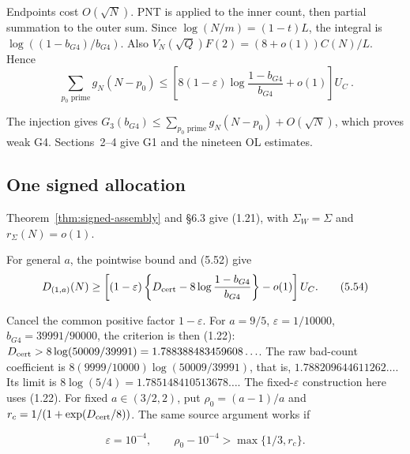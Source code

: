 Endpoints cost $O(\sqrt N)$.
PNT is applied to the inner count, then partial summation to the outer sum.
Since $\log(N/m)=(1-t)L$, the integral is
$\log((1-b_{G4})/b_{G4})$.
Also $V_N(\sqrt Q)F(2)=(8+o(1))C(N)/L$.
Hence
\[
 \boxed{\ \sum_{p_0\text{ prime}}g_N(N-p_0)\le
 \left[8(1-\varepsilon)\log\frac{1-b_{G4}}{b_{G4}}+o(1)\right]U_C\ }.
\tag{5.52}
\]

The injection gives
$G_3(b_{G4})\le\sum_{p_0\text{ prime}}g_N(N-p_0)+O(\sqrt N)$,
which proves weak G4.
Sections~2--4 give G1 and the nineteen OL estimates.

\subsection{One signed allocation}

Theorem~\ref{thm:signed-assembly} and \S{}6.3 give (1.21),
with $\Sigma_W=\Sigma$ and $r_\Sigma(N)=o(1)$.

For general $a$, the pointwise bound and (5.52) give
\[
 D_{(1,a)}(N)\ge
 \left[(1-\varepsilon)\left\{D_{\rm cert}
           -8\log\frac{1-b_{G4}}{b_{G4}}\right\}-o(1)\right]U_C.
\tag{5.54}
\]

\begingroup\sloppy
Cancel the common positive factor $1-\varepsilon$.
For $a=9/5$, $\varepsilon=1/10000$, $b_{G4}=39991/90000$,
the criterion is then (1.22):
$D_{\rm cert}>8\log(50009/39991)=1.788388483459608\ldots$.
The raw bad-count coefficient is
$8(9999/10000)\log(50009/39991)$, that is, $1.788209644611262\ldots$.
Its limit is $8\log(5/4)=1.785148410513678\ldots$.
The fixed-$\varepsilon$ construction here uses (1.22).
For fixed $a\in(3/2,2)$, put $\rho_0=(a-1)/a$ and
$r_c=1/(1+\exp(D_{\rm cert}/8))$.
The same source argument works if
\par\endgroup
\[
 \varepsilon=10^{-4},\qquad
 \rho_0-10^{-4}>\max\{1/3,r_c\}.
\tag{5.56}
\]

